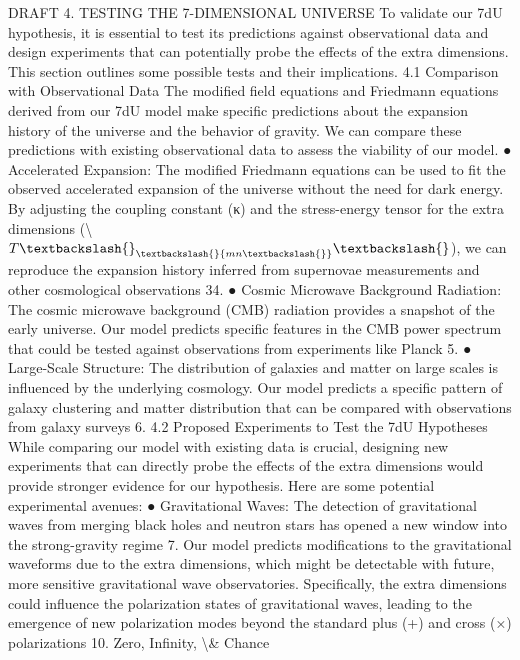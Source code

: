 \documentclass[12pt]{article}
\begin{document}
DRAFT
4. TESTING THE 7-DIMENSIONAL UNIVERSE
To validate our 7dU hypothesis, it is essential to test its predictions against observational data and
design experiments that can potentially probe the eﬀects of the extra dimensions. This section
outlines some possible tests and their implications.
4.1 Comparison with Observational Data
The modiﬁed ﬁeld equations and Friedmann equations derived from our 7dU model make
speciﬁc predictions about the expansion history of the universe and the behavior of gravity.
We can compare these predictions with existing observational data to assess the viability of
our model.
●
Accelerated Expansion: The modiﬁed Friedmann equations can be used to ﬁt the observed
accelerated expansion of the universe without the need for dark energy. By adjusting the
coupling constant (κ) and the stress-energy tensor for the extra dimensions (\textbackslash{}$T\textbackslash{}_\textbackslash{}{mn\textbackslash{}}\textbackslash{}$), we
can reproduce the expansion history inferred from supernovae measurements and other
cosmological observations 34.
●
Cosmic Microwave Background Radiation: The cosmic microwave background (CMB)
radiation provides a snapshot of the early universe. Our model predicts speciﬁc features in
the CMB power spectrum that could be tested against observations from experiments like
Planck 5.
●
Large-Scale Structure: The distribution of galaxies and matter on large scales is inﬂuenced
by the underlying cosmology. Our model predicts a speciﬁc pattern of galaxy clustering and
matter distribution that can be compared with observations from galaxy surveys 6.
4.2 Proposed Experiments to Test the 7dU Hypotheses
While comparing our model with existing data is crucial, designing new experiments that can
directly probe the eﬀects of the extra dimensions would provide stronger evidence for our
hypothesis. Here are some potential experimental avenues:
●
Gravitational Waves: The detection of gravitational waves from merging black holes and
neutron stars has opened a new window into the strong-gravity regime 7. Our model
predicts modiﬁcations to the gravitational waveforms due to the extra dimensions, which
might be detectable with future, more sensitive gravitational wave observatories.
Speciﬁcally, the extra dimensions could inﬂuence the polarization states of gravitational
waves, leading to the emergence of new polarization modes beyond the standard plus (+)
and cross (×) polarizations 10.
Zero, Infinity, \textbackslash{}& Chance
\end{document}
